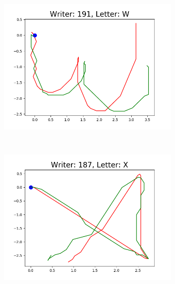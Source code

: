 \begin{figure}
\begin{subfigure}[b]{0.17\textwidth}
          \includegraphics[width=\textwidth]{images/framework/comparison_figures/W_191.png}
      \end{subfigure}
      ~
      \begin{subfigure}[b]{0.17\textwidth}
          \includegraphics[width=\textwidth]{images/framework/comparison_figures/X_187.png}
      \end{subfigure}
      ~
      \begin{subfigure}[b]{0.17\textwidth}

\end{subfigure}
\end{figure}
